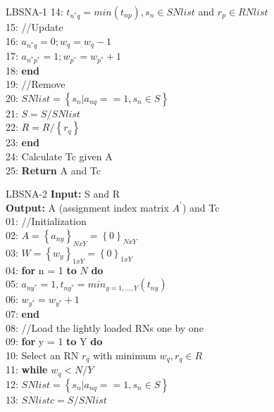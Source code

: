 \documentclass[main.tex]{subfiles}
\begin{document}
\begin{frame}{LBSNA-1}
14: \hspace{4mm}$t_{n^*q} = min(t_{np}), s_n \in SNlist$ and $r_p \in RNlist$\\
15: \hspace{4mm}//Update\\
16: \hspace{4mm}$a_{n^*q} = 0; w_q = w_q - 1$\\
17: \hspace{4mm}$a_{n^*p^*} = 1; w_{p^*} = w_{p^*} + 1$\\
18: \hspace{2mm}\textbf{end}\\
19: \hspace{2mm}//Remove\\
20: \hspace{2mm}$SNlist = \left\{s_n | a_{nq} == 1, s_n \in S\right\}$\\
21: \hspace{2mm}$S = S/SNlist$\\
22: \hspace{2mm}$R = R/\left\{r_q\right\}$\\
23: \textbf{end}\\
24: Calculate Tc given A\\
25: \textbf{Return} A and Tc\\
\end{frame}

\begin{frame}{LBSNA-2}
\textbf{Input:} S and R\\
\textbf{Output:} A (assignment index matrix $A^{'}$) and Tc\\
01: //Initialization\\
02: $A = \left\{a_{ny}\right\}_{NxY} = \left\{0\right\}_{NxY}$\\
03: $W = \left\{w_{y}\right\}_{1xY} = \left\{0\right\}_{1xY}$\\
04: \textbf{for} n = 1 \textbf{to} $N$ \textbf{do}\\
05: \hspace{2mm}$a_{ny^*} = 1, t_{ny^*} = min_{y=1,...,Y}(t_{ny})$\\
06: \hspace{2mm}$w_{y^*} = w_{y^*} + 1$\\
07: \textbf{end}\\
08: //Load the lightly loaded RNs one by one\\
09: \textbf{for} y = 1 \textbf{to} Y \textbf{do}\\
10: \hspace{2mm}Select an RN $r_q$ with minimum $w_q, r_q \in R$\\
11: \hspace{2mm}\textbf{while} $w_q < N/Y$\\
12: \hspace{4mm}$SNlist = \left\{s_n | a_{nq} == 1, s_n \in S\right\}$\\
13: \hspace{4mm}$SNlistc = S/SNlist$\\
\end{frame}
\end{document}
